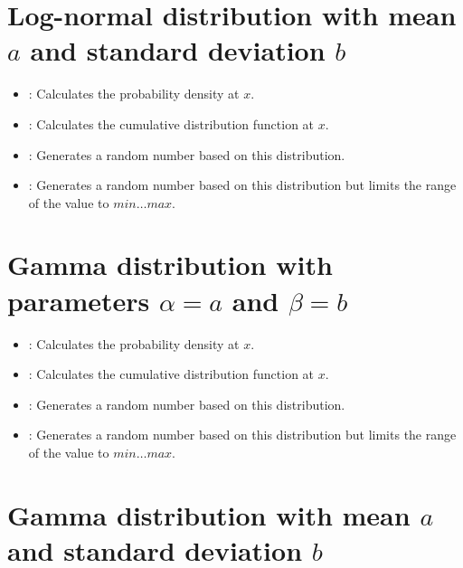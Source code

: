 \section{Log-normal distribution with mean \texorpdfstring{$a$}{a} and standard deviation \texorpdfstring{$b$}{b}}

\begin{itemize}

\item
{}:
Calculates the probability density at $x$.

\item
{}:
Calculates the cumulative distribution function at $x$.

\item
{}:
Generates a random number based on this distribution.

\item
{}:
Generates a random number based on this distribution but limits the range of the value to $min\ldots max$.

\end{itemize}



\section{Gamma distribution with parameters \texorpdfstring{$\alpha=a$}{a} and \texorpdfstring{$\beta=b$}{b}}

\begin{itemize}

\item
{}:
Calculates the probability density at $x$.

\item
{}:
Calculates the cumulative distribution function at $x$.

\item
{}:
Generates a random number based on this distribution.

\item
{}:
Generates a random number based on this distribution but limits the range of the value to $min\ldots max$.

\end{itemize}



\section{Gamma distribution with mean \texorpdfstring{$a$}{a} and standard deviation \texorpdfstring{$b$}{b}}

